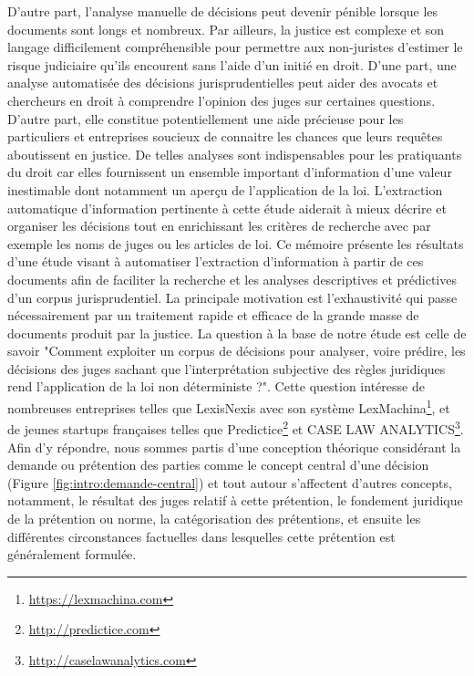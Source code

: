 D'autre part, l'analyse manuelle de décisions peut devenir pénible lorsque les documents sont longs et nombreux.  Par ailleurs, la justice est complexe et son langage difficilement compréhensible \citep{cretin2014justicecomplexe} pour permettre aux non-juristes d'estimer le risque judiciaire qu'ils encourent sans l'aide d'un initié en droit. D'une part, une analyse automatisée des décisions jurisprudentielles peut aider des avocats et chercheurs en droit à comprendre l'opinion des juges sur certaines questions. D'autre part, elle constitue potentiellement une aide précieuse pour les particuliers et entreprises soucieux de connaitre les chances que leurs requêtes aboutissent en justice.  De telles analyses sont indispensables pour les pratiquants du droit car elles fournissent un ensemble important d'information d'une valeur inestimable dont notamment un aperçu de l'application de la loi. L'extraction automatique d'information pertinente à cette étude aiderait à mieux décrire et organiser les décisions tout en enrichissant les critères de recherche avec par exemple les noms de juges ou les articles de loi. Ce mémoire présente les résultats d'une étude visant à automatiser l'extraction d'information à partir de ces documents afin de faciliter la recherche et les analyses descriptives et prédictives d'un corpus jurisprudentiel. La principale motivation est l'exhaustivité qui passe nécessairement par un traitement rapide et efficace de la grande masse de documents produit par la justice. La question à la base de notre étude est celle de savoir "Comment exploiter un corpus de décisions pour analyser, voire prédire, les décisions des juges sachant que l'interprétation subjective des règles juridiques rend l'application de la loi non déterministe ?". Cette question intéresse de nombreuses entreprises telles que LexisNexis avec son système LexMachina\footnote{\url{https://lexmachina.com}}, et de jeunes startups françaises telles que Predictice\footnote{\url{http://predictice.com}} et CASE LAW ANALYTICS\footnote{\url{http://caselawanalytics.com}}. Afin d'y répondre, nous sommes partis d'une conception théorique considérant la demande ou prétention des parties comme le concept central d'une décision (Figure \ref{fig:intro:demande-central}) et tout autour s'affectent d'autres concepts, notamment, le résultat des juges relatif à cette prétention, le fondement juridique de la prétention ou norme, la catégorisation des prétentions, et ensuite les différentes circonstances factuelles dans lesquelles cette prétention est généralement formulée. 

